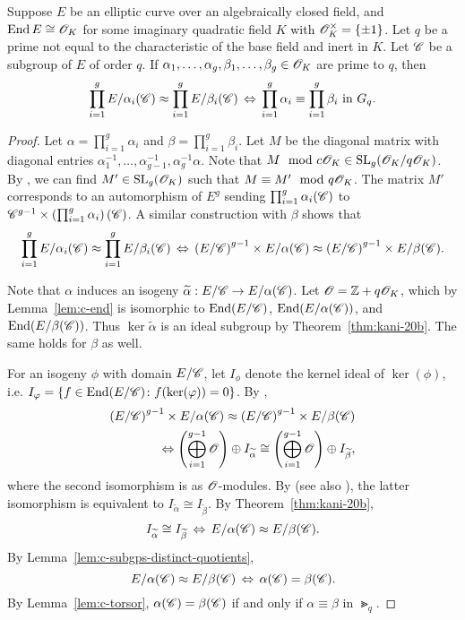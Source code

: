 \documentclass{amsart}
\begin{document}
\begin{lemma}\label{lem:prod-equiv-torsor}
  Suppose $E$ be an elliptic curve over an algebraically closed field, and $\operatorname{End} E \cong \mathscr{O}_K$ for some imaginary quadratic field $K$ with $\mathscr{O}_K^\times = \{\pm 1\}$. Let $q$ be a prime not equal to the characteristic of the base field and inert in $K$. Let $\mathscr{C}$ be a subgroup of $E$ of order $q$. If $\alpha_1,\dots,\alpha_g,\beta_1,\dots,\beta_g \in \mathscr{O}_K$ are prime to $q$, then
  \[
    \prod_{i=1}^g E/\alpha_i(\mathscr{C}) \approx \prod_{i=1}^g E/\beta_i(\mathscr{C})
    \,\Leftrightarrow\,
    \prod_{i=1}^g \alpha_i \equiv \prod_{i=1}^g \beta_i \text{ in } G_q.
  \]
\end{lemma}
\begin{proof}
  Let $\alpha = \prod_{i=1}^g\alpha_i$ and $\beta = \prod_{i=1}^g\beta_i$. Let $M$ be the diagonal matrix with diagonal entries $\alpha_1^{-1},\dots,\alpha_{g-1}^{-1}, \alpha_g^{-1}\alpha$. Note that $M\mod{c\mathscr{O}_K} \in \operatorname{SL}_g(\mathscr{O}_K/q\mathscr{O}_K)$. By \cite[Cor.~5.2, Pg.~18]{ktheory1964bass}, we can find $M' \in \operatorname{SL}_g(\mathscr{O}_K)$ such that $M \equiv M' \mod{q\mathscr{O}_K}$. The matrix $M'$ corresponds to an automorphism of $E^g$ sending $\prod_{i=1}^g \alpha_i(\mathscr{C})$ to $\mathscr{C}^{g-1} \times \left(\prod_{i=1}^g \alpha_i\right)(\mathscr{C})$. A similar construction with $\beta$ shows that
  \[
    \prod_{i=1}^g E/\alpha_i(\mathscr{C}) \approx \prod_{i=1}^g E/\beta_i(\mathscr{C})
    \,\Leftrightarrow\,
    \left(E/\mathscr{C}\right)^{g-1} \times E/\alpha(\mathscr{C}) \approx \left(E/\mathscr{C}\right)^{g-1} \times E/\beta(\mathscr{C}).
  \]

  Note that $\alpha$ induces an isogeny $\widetilde{\alpha}: E/\mathscr{C} \to E/\alpha(\mathscr{C})$. Let $\mathscr{O} = \mathbb{Z} + q\mathscr{O}_K$, which by Lemma~\ref{lem:c-end} is isomorphic to $\operatorname{End}(E/\mathscr{C})$, $\operatorname{End}(E/\alpha(\mathscr{C}))$, and $\operatorname{End}(E/\beta(\mathscr{C}))$. Thus $\ker\tilde{\alpha}$ is an ideal subgroup by Theorem~\ref{thm:kani-20b}. The same holds for $\beta$ as well.

  For an isogeny $\phi$ with domain $E/\mathscr{C}$, let $I_\phi$ denote the kernel ideal of $\ker(\phi)$, i.e. $I_\varphi = \{f \in \operatorname{End}(E/\mathscr{C}) \colon f(\ker(\varphi)) = 0\}$.
  By \cite[Thm.~46]{kani2011products},
  \begin{align*}
    \left(E/\mathscr{C}\right)^{g-1} \times E/\alpha(\mathscr{C}) \approx \left(E/\mathscr{C}\right)^{g-1} \times E/\beta(\mathscr{C})
    \\
    \Leftrightarrow
    \left(\bigoplus_{i=1}^{g-1} \mathscr{O}\right) \oplus I_{\widetilde{\alpha}} \cong \left(\bigoplus_{i=1}^{g-1} \mathscr{O}\right) \oplus I_{\widetilde{\beta}},
  \end{align*}
  where the second isomorphism is as $\mathscr{O}$-modules. By \cite[Thm.~48]{kani2011products} (see also \cite[Rem.~49b]{kani2011products}), the latter isomorphism is equivalent to $I_{\tilde{\alpha}} \cong I_{\tilde{\beta}}$.
  By Theorem~\ref{thm:kani-20b},
  \[
    I_{\widetilde{\alpha}} \cong I_{\widetilde{\beta}}
    \,\Leftrightarrow\,
    E/\alpha(\mathscr{C}) \approx E/\beta(\mathscr{C}).
  \]
  By Lemma~\ref{lem:c-subgps-distinct-quotients},
  \[
    E/\alpha(\mathscr{C}) \approx E/\beta(\mathscr{C})
    \,\Leftrightarrow\,
    \alpha(\mathscr{C}) = \beta(\mathscr{C}).
  \]
  By Lemma~\ref{lem:c-torsor}, $\alpha(\mathscr{C}) = \beta(\mathscr{C})$ if and only if $\alpha \equiv \beta$ in $\Gt_q$.
\end{proof}
\end{document}
